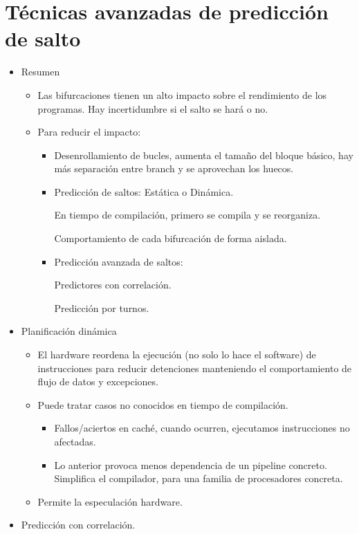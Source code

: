 \documentclass[12pt, twoside, openright]{report} %
\begin{document}
\section{Técnicas avanzadas de predicción de salto}

\begin{itemize}
  \item Resumen

    \begin{itemize}
    
    \item
      Las bifurcaciones tienen un alto impacto sobre el rendimiento de
      los programas. Hay incertidumbre si el salto se hará o no.
    \item
      Para reducir el impacto:

      \begin{itemize}
      
      \item
        Desenrollamiento de bucles, aumenta el tamaño del bloque básico,
        hay más separación entre branch y se aprovechan los huecos.
      \item
        Predicción de saltos: Estática o Dinámica.

        
          En tiempo de compilación, primero se compila y se reorganiza.

          Comportamiento de cada bifurcación de forma aislada.
      \item
        Predicción avanzada de saltos:

        
          Predictores con correlación.
          
          Predicción por turnos.
        \end{itemize}
      \end{itemize}
      \pagebreak
  \item Planificación dinámica

    \begin{itemize}
    
    \item
      El hardware reordena la ejecución (no solo lo hace el software) de
      instrucciones para reducir detenciones manteniendo el
      comportamiento de flujo de datos y excepciones.
    \item
      Puede tratar casos no conocidos en tiempo de compilación.

      \begin{itemize}
      
      \item
        Fallos/aciertos en caché, cuando ocurren, ejecutamos
        instrucciones no afectadas.
      \item
        Lo anterior provoca menos dependencia de un pipeline concreto.
        Simplifica el compilador, para una familia de procesadores
        concreta.
      \end{itemize}
    \item
      Permite la especulación hardware.
    \end{itemize}
  \item Predicción con correlación.


\end{itemize}
\end{document}
